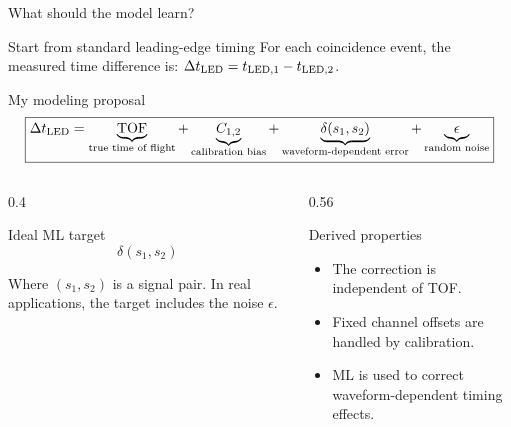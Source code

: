 \begin{frame}{What should the model learn?}
\small

\begin{block}{Start from standard leading-edge timing}
For each coincidence event, the measured time difference is:  $\Delta t_{\operatorname{LED}}=t_{\operatorname{LED},1}-t_{\operatorname{LED},2}$.

\end{block}

\vspace{-0.15em}

\begin{alertblock}{My modeling proposal}
\large
\[
\boxed{
\Delta t_{\operatorname{LED}}
=
\underbrace{\operatorname{TOF}}_{\text{true time of flight}}
+
\underbrace{C_{1,2}}_{\text{calibration bias}}
+
\underbrace{\delta(s_1,s_2)}_{\text{waveform-dependent error}}
+
\underbrace{\epsilon}_{\text{random noise}}
}
\]
\small

\end{alertblock}

\vspace{0.1em}

\begin{columns}[T,totalwidth=\textwidth]

\begin{column}{0.4\textwidth}
\begin{block}{Ideal ML target}
\vspace{-0.3em}
\normalsize
\[
\boxed{\delta(s_1,s_2)}
\]
\small
\vspace{-1em}

Where $(s_1,s_2)$ is a signal pair. In real applications, the target includes the noise $\epsilon$.

\end{block}
\end{column}

\begin{column}{0.56\textwidth}
\begin{block}{Derived properties}
\begin{itemize}
    \item The correction is independent of TOF.
    \item Fixed channel offsets are handled by calibration.
    \item ML is used to correct waveform-dependent timing effects.
\end{itemize}
\end{block}
\end{column}

\end{columns}

\end{frame}
